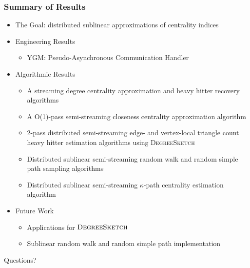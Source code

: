 \documentclass{beamer}
\newcommand{\algoname}[1]{\textnormal{\textsc{#1}}}
\begin{document}
\begin{frame}
\frametitle{Summary of Results}

\begin{itemize}
	\item The Goal: distributed sublinear approximations of centrality indices
	\item Engineering Results
	\begin{itemize}
		\item \algoname{YGM}: Pseudo-Asynchronous 	Communication Handler
	\end{itemize}
	\item Algorithmic Results
	\begin{itemize}
		\item A streaming degree centrality approximation and heavy hitter recovery algorithms
		\item A O(1)-pass semi-streaming closeness centrality approximation algorithm
		\item 2-pass distributed semi-streaming edge- and vertex-local triangle count heavy hitter estimation algorithms using \algoname{DegreeSketch}
		\item Distributed sublinear semi-streaming random walk and random simple path sampling algorithms
		\item Distributed sublinear semi-streaming $\kappa$-path centrality estimation algorithm
	\end{itemize}
	\item Future Work
	\begin{itemize}
		\item Applications for $\algoname{DegreeSketch}$
		\item Sublinear random walk and random simple path implementation
	\end{itemize}
\end{itemize}

\end{frame}




\begin{frame}

\begin{center}
{\Huge Questions?}
\end{center}

\end{frame}


 
%
\end{document}
